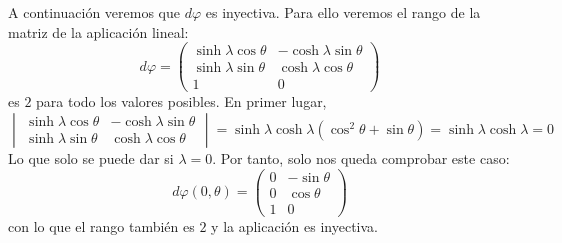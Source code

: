 A continuación veremos que $d \varphi$ es inyectiva. Para ello veremos el rango
de la matriz de la aplicación lineal:
\[
    d \varphi = \begin{pmatrix}
    \sinh \lambda \cos \theta & -\cosh \lambda \sin \theta\\
    \sinh \lambda \sin \theta & \cosh \lambda \cos \theta\\
    1 & 0
    \end{pmatrix}
\]
es $2$ para todo los valores posibles. En primer lugar,
\[
\begin{vmatrix} 
    \sinh \lambda \cos \theta & -\cosh \lambda \sin \theta\\
    \sinh \lambda \sin \theta & \cosh \lambda \cos \theta
\end{vmatrix} = \sinh \lambda \cosh \lambda \left( \cos^2 \theta + \sin \theta
\right) = \sinh \lambda \cosh \lambda = 0
\]
Lo que solo se puede dar si $\lambda = 0$. Por tanto, solo nos queda comprobar
este caso:
\[
d \varphi \left( 0, \theta \right) = \begin{pmatrix} 
    0 & -\sin \theta\\
    0 & \cos \theta\\
    1 & 0
\end{pmatrix}
\]
con lo que el rango también es $2$ y la aplicación es inyectiva.

